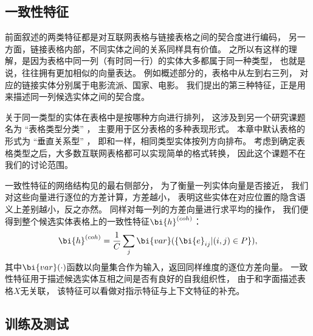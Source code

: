 \subsection{一致性特征}
\label{sec:tabel-coherence}


前面叙述的两类特征都是对互联网表格与链接表格之间的契合度进行编码，
另一方面，链接表格内部，不同实体之间的关系同样具有价值。
之所以有这样的理解，是因为表格中同一列（有时同一行）的实体大多都属于同一种类型，
也就是说，往往拥有更加相似的向量表达。
例如概述部分的，表格中从左到右三列，
对应的链接实体分别属于电影流派、国家、电影。
我们提出的第三种特征，正是用来描述同一列候选实体之间的契合度。


关于同一类型的实体在表格中是按哪种方向进行排列，
这涉及到另一个研究课题名为 ``{表格类型分类}''
\cite{eberius2015building,nishida2017understanding}，
主要用于区分表格的多种表现形式。
本章中默认表格的形式为 ``{垂直关系型}'' \cite{nishida2017understanding}，
即和一样，相同类型实体按列方向排布。
考虑到确定表格类型之后，大多数互联网表格都可以实现简单的格式转换，
因此这个课题不在我们的讨论范围。

一致性特征的网络结构见的最右侧部分，
为了衡量一列实体向量是否接近，
我们对这些向量进行逐位的方差计算，方差越小，
表明这些实体在对应位置的隐含语义上差别越小，反之亦然。
同样对每一列的方差向量进行求平均的操作，
我们便得到整个候选实体表格上的一致性特征$\bi{h}^{(coh)}$：
\begin{equation}
  \label{eqn:coherence}
    \bi{h}^{(coh)} = \frac{1}{C} \sum_{j} \bi{var}(\{\bi{e}_{ij} | (i,j) \in P \}),
\end{equation}
\noindent
其中$\bi{var}(\cdot)$函数以向量集合作为输入，返回同样维度的逐位方差向量。
一致性特征用于描述候选实体互相之间是否有良好的自我组织性，
由于和字面描述表格$X$无关联，
该特征可以看做对指示特征与上下文特征的补充。


\subsection{训练及测试}
\label{sec:tabel-strategy}

